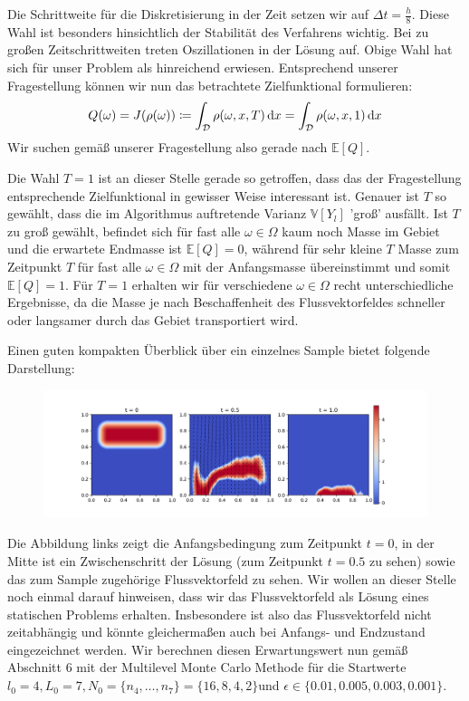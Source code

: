 Die Schrittweite für die Diskretisierung in der Zeit setzen wir auf $ \Delta t = \frac{h}{8} $. Diese Wahl ist besonders hinsichtlich der Stabilität des Verfahrens wichtig. Bei zu großen Zeitschrittweiten treten Oszillationen in der Lösung auf. Obige Wahl hat sich für unser Problem als hinreichend erwiesen.
Entsprechend unserer Fragestellung können wir nun das betrachtete Zielfunktional formulieren:
\[
Q(\omega) = J(\rho(\omega)) \coloneqq \int_{\mathcal{D}} \rho(\omega,x,T) \, \mathrm{d} x = \int_{\mathcal{D}} \rho(\omega,x,1) \, \mathrm{d} x
\]
Wir suchen gemäß unserer Fragestellung also gerade nach $ \mathbb{E}[Q] $.
\begin{Bemerkung2}\label{wahlfunk}
	Die Wahl $ T=1 $ ist an dieser Stelle gerade so getroffen, dass das der Fragestellung entsprechende Zielfunktional in gewisser Weise interessant ist. 
	Genauer ist $ T $ so gewählt, dass die im Algorithmus auftretende Varianz $ \mathbb{V}[Y_l] $ 'groß' ausfällt. Ist $ T $ zu groß gewählt, befindet sich für fast alle $ \omega \in \Omega $ kaum noch Masse im Gebiet und die erwartete Endmasse ist $ \mathbb{E}[Q] = 0 $, während für sehr kleine $ T $ Masse zum Zeitpunkt $ T $ für fast alle $ \omega \in \Omega $ mit der Anfangsmasse übereinstimmt und somit $ \mathbb{E}[Q] = 1$. Für $ T = 1 $ erhalten wir für verschiedene $ \omega \in \Omega $ recht unterschiedliche Ergebnisse, da die Masse je nach Beschaffenheit des Flussvektorfeldes schneller oder langsamer durch das Gebiet transportiert wird. 
\end{Bemerkung2}
Einen guten kompakten Überblick über ein einzelnes Sample bietet folgende Darstellung:
\begin{figure}[H]
	\centering
	\includegraphics[width=\textwidth]{plots/solution3.png} 
\end{figure}
Die Abbildung links zeigt die Anfangsbedingung zum Zeitpunkt $ t=0 $, in der Mitte ist ein Zwischenschritt der Lösung (zum Zeitpunkt $ t=0.5 $ zu sehen) sowie das zum Sample zugehörige Flussvektorfeld zu sehen. Wir wollen an dieser Stelle noch einmal darauf hinweisen, dass wir das Flussvektorfeld als Lösung eines statischen Problems erhalten. Insbesondere ist also das Flussvektorfeld nicht zeitabhängig und könnte gleichermaßen auch bei Anfangs- und Endzustand eingezeichnet werden. 
Wir berechnen diesen Erwartungswert nun gemäß Abschnitt 6 mit der Multilevel Monte Carlo Methode für die Startwerte $ l_0 = 4, L_0 = 7, N_0 = \{n_4,\dots,n_7\} = \{16,8,4,2\} $und $ \epsilon \in \{0.01,0.005,0.003,0.001\} $.
